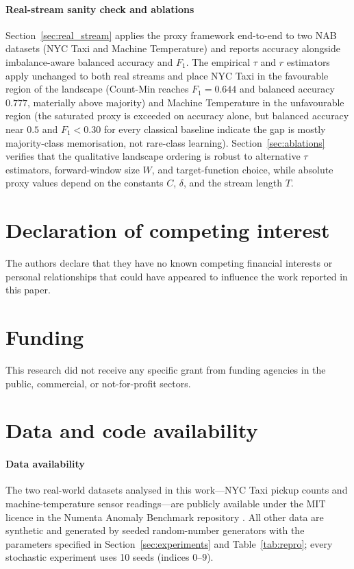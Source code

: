 \documentclass[preprint,12pt,authoryear]{elsarticle}
\begin{document}
\paragraph{Real-stream sanity check and ablations} Section~\ref{sec:real_stream} applies the proxy framework end-to-end to two NAB datasets (NYC Taxi and Machine Temperature) and reports accuracy alongside imbalance-aware balanced accuracy and $F_1$. The empirical $\tau$ and $r$ estimators apply unchanged to both real streams and place NYC Taxi in the favourable region of the landscape (Count-Min reaches $F_1 = 0.644$ and balanced accuracy $0.777$, materially above majority) and Machine Temperature in the unfavourable region (the saturated proxy is exceeded on accuracy alone, but balanced accuracy near $0.5$ and $F_1 < 0.30$ for every classical baseline indicate the gap is mostly majority-class memorisation, not rare-class learning). Section~\ref{sec:ablations} verifies that the qualitative landscape ordering is robust to alternative $\tau$ estimators, forward-window size $W$, and target-function choice, while absolute proxy values depend on the constants $C$, $\delta$, and the stream length $T$.


\section*{Declaration of competing interest}
The authors declare that they have no known competing financial interests or personal relationships that could have appeared to influence the work reported in this paper.

\section*{Funding}
This research did not receive any specific grant from funding agencies in the public, commercial, or not-for-profit sectors.

\section*{Data and code availability}

\paragraph{Data availability} The two real-world datasets analysed in this work---NYC Taxi pickup counts and machine-temperature sensor readings---are publicly available under the MIT licence in the Numenta Anomaly Benchmark repository \citep{ahmad2017numenta}. All other data are synthetic and generated by seeded random-number generators with the parameters specified in Section~\ref{sec:experiments} and Table~\ref{tab:repro}; every stochastic experiment uses 10 seeds (indices $0$--$9$).
\end{document}
